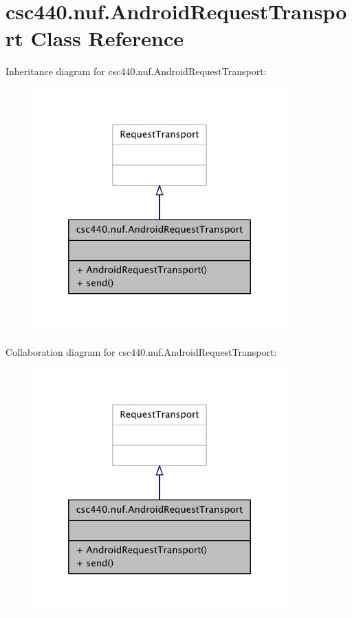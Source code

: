 \hypertarget{classcsc440_1_1nuf_1_1_android_request_transport}{\section{csc440.\-nuf.\-Android\-Request\-Transport Class Reference}
\label{classcsc440_1_1nuf_1_1_android_request_transport}
}


Inheritance diagram for csc440.\-nuf.\-Android\-Request\-Transport\-:
\nopagebreak
\begin{figure}[H]
\begin{center}
\leavevmode
\includegraphics[width=276pt]{classcsc440_1_1nuf_1_1_android_request_transport__inherit__graph}
\end{center}
\end{figure}


Collaboration diagram for csc440.\-nuf.\-Android\-Request\-Transport\-:
\nopagebreak
\begin{figure}[H]
\begin{center}
\leavevmode
\includegraphics[width=276pt]{classcsc440_1_1nuf_1_1_android_request_transport__coll__graph}
\end{center}
\end{figure}
